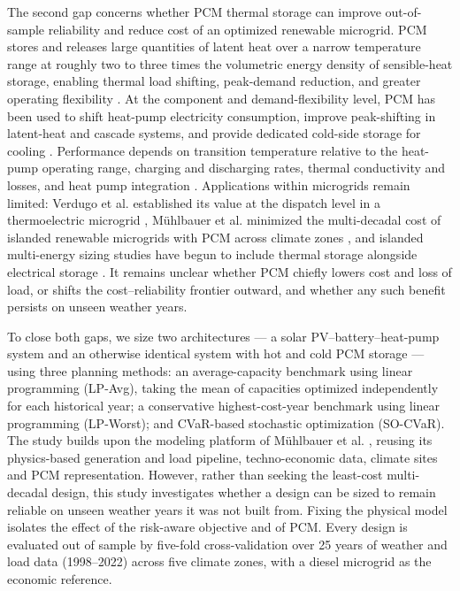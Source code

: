 \documentclass[
  journal=large,
  manuscript=article-type,
  year=2020,
  volume=37,
]{cup-journal}
\begin{document}
The second gap concerns whether PCM thermal storage can improve out-of-sample reliability and reduce cost of an optimized renewable microgrid. PCM stores and releases large quantities of latent heat over a narrow temperature range at roughly two to three times the volumetric energy density of sensible-heat storage, enabling thermal load shifting, peak-demand reduction, and greater operating flexibility \parencite{ref29,ref30}. At the component and demand-flexibility level, PCM has been used to shift heat-pump electricity consumption, improve peak-shifting in latent-heat and cascade systems, and provide dedicated cold-side storage for cooling \parencite{ref18,ref19,ref20,ref21,ref22}. Performance depends on transition temperature relative to the heat-pump operating range, charging and discharging rates, thermal conductivity and losses, and heat pump integration \parencite{ref19,ref20,ref21,ref22,ref30}. Applications within microgrids remain limited: Verdugo et al. established its value at the dispatch level in a thermoelectric microgrid \parencite{ref23}, M\"uhlbauer et al. minimized the multi-decadal cost of islanded renewable microgrids with PCM across climate zones \parencite{ref7}, and islanded multi-energy sizing studies have begun to include thermal storage alongside electrical storage \parencite{ref32}. It remains unclear whether PCM chiefly lowers cost and loss of load, or shifts the cost--reliability frontier outward, and whether any such benefit persists on unseen weather years.

To close both gaps, we size two architectures --- a solar PV--battery--heat-pump system and an otherwise identical system with hot and cold PCM storage --- using three planning methods: an average-capacity benchmark using linear programming (LP-Avg), taking the mean of capacities optimized independently for each historical year; a conservative highest-cost-year benchmark using linear programming (LP-Worst); and CVaR-based stochastic optimization (SO-CVaR). The study builds upon the modeling platform of M\"uhlbauer et al. \parencite{ref7}, reusing its physics-based generation and load pipeline, techno-economic data, climate sites and PCM representation. However, rather than seeking the least-cost multi-decadal design, this study investigates whether a design can be sized to remain reliable on unseen weather years it was not built from. Fixing the physical model isolates the effect of the risk-aware objective and of PCM. Every design is evaluated out of sample by five-fold cross-validation over 25 years of weather and load data (1998--2022) across five climate zones, with a diesel microgrid as the economic reference.
\end{document}
